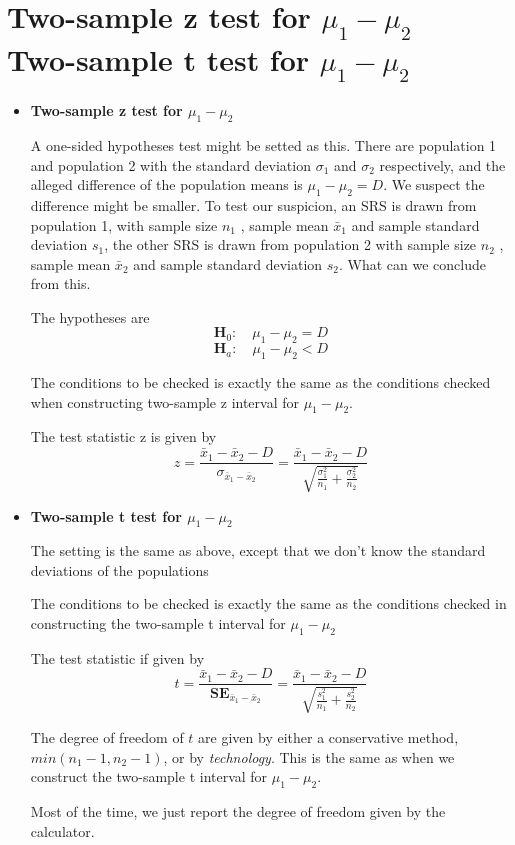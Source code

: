 \documentclass[a4paper, 12pt,twoside]{book}
\begin{document}
\section{Two-sample z test for $\mu_1-\mu_2$\\Two-sample t test for $\mu_1-\mu_2$}
\begin{itemize}
   \item \textbf{Two-sample z test for $\mu_1-\mu_2$}\vspace{0.3cm}
   
   A one-sided hypotheses test might be setted as this.  There are population 1 and population 2 with the standard deviation $\sigma_1$ and $\sigma_2$ respectively, and the alleged difference of the population means is $\mu_1-\mu_2=D$. We suspect the difference might be smaller. To test our suspicion, an SRS is drawn from population 1, with sample size $n_1$ , sample mean $\bar{x}_1$ and sample standard deviation $s_1$, the other SRS is drawn from population 2 with sample size $n_2$ , sample mean $\bar{x}_2$ and sample standard deviation $s_2$. What can we conclude from this.\vspace{0.3cm}
   
   The hypotheses are
   $$\textbf{H}_0:\quad \mu_1-\mu_2 = D$$
   $$\textbf{H}_a:\quad \mu_1-\mu_2 < D$$
   
   The conditions to be checked is exactly the same as the conditions checked when constructing two-sample z interval for $\mu_1-\mu_2$.\vspace{0.3cm}
   
   The test statistic z is given by 
   $$z=\frac{\bar{x}_1- \bar{x}_2-D}{\sigma_{\bar{x}_1- \bar{x}_2}} = \frac{\bar{x}_1- \bar{x}_2-D}{\sqrt{\frac{\sigma_1^2}{n_1} + \frac{\sigma_2^2}{n_2}}}$$
   
 \item \textbf{Two-sample t test for $\mu_1-\mu_2$} \vspace{0.3cm}
 
  The setting is the same as above, except that we don't know the standard deviations of the populations \vspace{0.3cm}
  
  The conditions to be checked is exactly the same as the conditions checked in constructing the two-sample t interval for $\mu_1-\mu_2$\vspace{0.3cm}
  
  The test statistic if given by 
   $$t=\frac{\bar{x}_1- \bar{x}_2-D}{\textbf{SE}_{\bar{x}_1- \bar{x}_2}} = \frac{\bar{x}_1- \bar{x}_2-D}{\sqrt{\frac{s_1^2}{n_1} + \frac{s_2^2}{n_2}}}$$
   
   The degree of freedom of $t$ are given by either a conservative method, $min(n_1-1, n_2-1)$, or by \textit{technology}. This is the same as when we construct the two-sample t interval for $\mu_1-\mu_2$.\vspace{0.3cm}
   
   \colorbox{babypink}{\parbox{0.9\textwidth}{
   Most of the time, we just report the degree of freedom given by the calculator.
   }}
\end{itemize}
\end{document}
